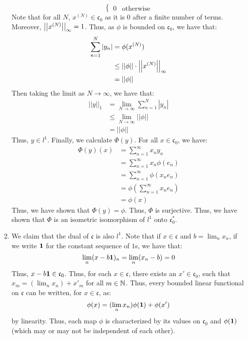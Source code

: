 \documentclass[12pt]{article}
\begin{document}
\begin{solution}
\begin{enumerate}
\[\begin{cases}
            0 & \text{otherwise}
        \end{cases}\]
        Note that for all $N$, $x^{(N)} \in \mathfrak{c}_0$ as it is $0$ after a finite number of terms. Moreover, $\left\vert\left\vert x^{(N)}\right\vert\right\vert_\infty = 1$. Thus, as $\phi$ is bounded on $\mathfrak{c}_0$, we have that:
        \begin{align*}
            \sum_{n=1}^N |y_n| &= \phi(x^{(N)}) \\
            &\leq ||\phi|| \cdot \left\vert\left\vert x^{(N)}\right\vert\right\vert_{\infty} \\
            &= ||\phi||
        \end{align*}
        Then taking the limit as $N \to \infty$, we have that:
        \begin{align*}
            ||y||_1 &= \lim_{N \to \infty} \sum_{n=1}^N |y_n| \\
            &\leq \lim_{N \to \infty} ||\phi|| \\
            &= ||\phi||
        \end{align*}
        Thus, $y \in l^1$. Finally, we calculate $\Phi(y)$. For all $x \in \mathfrak{c}_0$, we have: 
        \begin{align*}
            \Phi(y)(x) &= \sum_{n=1}^\infty x_ny_n \\
            &= \sum_{n=1}^\infty x_n\phi(e_n) \\
            &= \sum_{n=1}^\infty \phi(x_n e_n) \\
            &= \phi\left(\sum_{n=1}^\infty x_n e_n\right) \\
            &= \phi(x) 
        \end{align*}
        Thus, we have shown that $\Phi(y) = \phi$. Thus, $\Phi$ is surjective. \bbni
        Thus, we have shown that $\Phi$ is an isometric isomorphism of $l^1$ onto $\mathfrak{c}_0^*$.
        \item We claim that the dual of $\mathfrak{c}$ is also $l^1$. Note that if $x \in \mathfrak c$ and $b = \lim_n x_n$, if we write $\mathbf{1}$ for the constant sequence of $1$s, we have that: 
        \[ \lim_n (x - b\mathbf{1})_n = \lim_n (x_n - b) = 0 \]
        Thus, $x-b\mathbf{1} \in \mathfrak{c}_0$. Thus, for each $x \in \mathfrak c$, there exists an $x' \in \mathfrak{c}_0$, such that $x_m = (\lim_n x_n) + x'_m$ for all $m \in \mathbb N$. Thus, every bounded linear functional on $\mathfrak{c}$ can be written, for $x \in \mathfrak{c}$, as:
        \[ \phi(x) = (\lim_n x_n)\phi(\mathbf{1}) + \phi(x')\]
        by linearity. Thus, each map $\phi$ is characterized by its values on $\mathfrak{c}_0$ and $\phi(\mathbf{1})$ (which may or may not be independent of each other). \bbni

\end{enumerate}
\end{solution}
\end{document}
